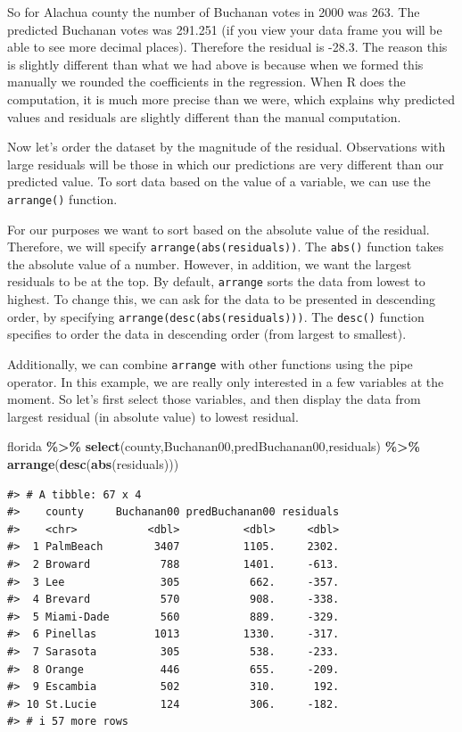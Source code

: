 \documentclass[
]{book}
\newenvironment{Shaded}{\begin{snugshade}}{\end{snugshade}}
\newcommand{\FunctionTok}[1]{\textcolor[rgb]{0.13,0.29,0.53}{\textbf{#1}}}
\newcommand{\NormalTok}[1]{#1}
\newcommand{\SpecialCharTok}[1]{\textcolor[rgb]{0.81,0.36,0.00}{\textbf{#1}}}
\begin{document}
So for Alachua county the number of Buchanan votes in 2000 was 263. The predicted Buchanan votes was 291.251 (if you view your data frame you will be able to see more decimal places). Therefore the residual is -28.3. The reason this is slightly different than what we had above is because when we formed this manually we rounded the coefficients in the regression. When R does the computation, it is much more precise than we were, which explains why predicted values and residuals are slightly different than the manual computation.

Now let's order the dataset by the magnitude of the residual. Observations with large residuals will be those in which our predictions are very different than our predicted value. To sort data based on the value of a variable, we can use the \texttt{arrange()} function.

For our purposes we want to sort based on the absolute value of the residual. Therefore, we will specify \texttt{arrange(abs(residuals))}. The \texttt{abs()} function takes the absolute value of a number. However, in addition, we want the largest residuals to be at the top. By default, \texttt{arrange} sorts the data from lowest to highest. To change this, we can ask for the data to be presented in descending order, by specifying \texttt{arrange(desc(abs(residuals)))}. The \texttt{desc()} function specifies to order the data in descending order (from largest to smallest).

Additionally, we can combine \texttt{arrange} with other functions using the pipe operator. In this example, we are really only interested in a few variables at the moment. So let's first select those variables, and then display the data from largest residual (in absolute value) to lowest residual.

\begin{Shaded}
\begin{Highlighting}[]
\NormalTok{florida }\SpecialCharTok{\%\textgreater{}\%} 
  \FunctionTok{select}\NormalTok{(county,Buchanan00,predBuchanan00,residuals) }\SpecialCharTok{\%\textgreater{}\%}
  \FunctionTok{arrange}\NormalTok{(}\FunctionTok{desc}\NormalTok{(}\FunctionTok{abs}\NormalTok{(residuals)))}
\end{Highlighting}
\end{Shaded}

\begin{verbatim}
#> # A tibble: 67 x 4
#>    county     Buchanan00 predBuchanan00 residuals
#>    <chr>           <dbl>          <dbl>     <dbl>
#>  1 PalmBeach        3407          1105.     2302.
#>  2 Broward           788          1401.     -613.
#>  3 Lee               305           662.     -357.
#>  4 Brevard           570           908.     -338.
#>  5 Miami-Dade        560           889.     -329.
#>  6 Pinellas         1013          1330.     -317.
#>  7 Sarasota          305           538.     -233.
#>  8 Orange            446           655.     -209.
#>  9 Escambia          502           310.      192.
#> 10 St.Lucie          124           306.     -182.
#> # i 57 more rows
\end{verbatim}
\end{document}
